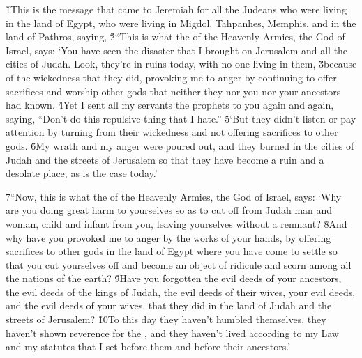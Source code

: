 \v{1}This is the message that came to Jeremiah for all the Judeans who were living in the land of Egypt, who were living in Migdol, Tahpanhes, Memphis, and in the land of Pathros, saying, \v{2}``This is what the  of the Heavenly Armies, the God of Israel, says: `You have seen the disaster that I brought on Jerusalem and all the cities of Judah. Look, they're in ruins today, with no one living in them, \v{3}because of the wickedness that they did, provoking me to anger by continuing to offer sacrifices and worship other gods that neither they nor you nor your ancestors had known. \v{4}Yet I sent all my servants the prophets to you again and again, saying, ``Don't do this repulsive thing that I hate.'' \v{5}`But they didn't listen or pay attention by turning from their wickedness and not offering sacrifices to other gods. \v{6}My wrath and my anger were poured out, and they burned in the cities of Judah and the streets of Jerusalem so that they have become a ruin and a desolate place, as is the case today.'

\v{7}``Now, this is what the  of the Heavenly Armies, the God of Israel, says: `Why are you doing great harm to yourselves so as to cut off from Judah man and woman, child and infant from you, leaving yourselves without a remnant? \v{8}And why have you provoked me to anger by the works of your hands, by offering sacrifices to other gods in the land of Egypt where you have come to settle so that you cut yourselves off and become an object of ridicule and scorn among all the nations of the earth? \v{9}Have you forgotten the evil deeds of your ancestors, the evil deeds of the kings of Judah, the evil deeds of their wives, your evil deeds, and the evil deeds of your wives, that they did in the land of Judah and the streets of Jerusalem? \v{10}To this day they haven't humbled themselves, they haven't shown reverence for the , and they haven't lived according to my Law and my statutes that I set before them and before their ancestors.'

